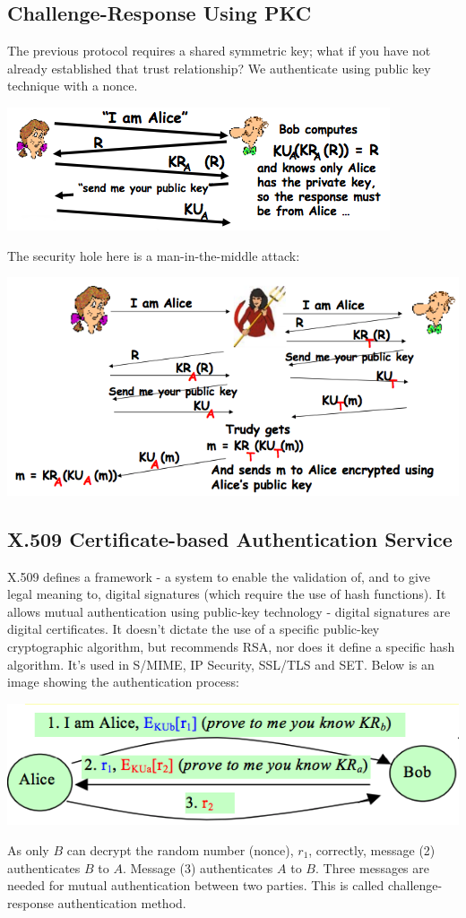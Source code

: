 \documentclass{article}
\begin{document}
\subsection{Challenge-Response Using PKC}
The previous protocol requires a shared symmetric key; what if you have not already established that trust relationship? We authenticate using public key technique with a nonce.
\begin{center}
  \includegraphics[scale=0.7]{crpkc.png}
\end{center}
The security hole here is a man-in-the-middle attack:
\begin{center}
  \includegraphics[scale=0.5]{crpkc-mitm.png}
\end{center}

\subsection{X.509 Certificate-based Authentication Service}
X.509 defines a framework - a system to enable the validation of, and to give legal meaning to, digital signatures (which require the use of hash functions). It allows mutual authentication using public-key technology - digital signatures are digital certificates. It doesn't dictate the use of a specific public-key cryptographic algorithm, but recommends RSA, nor does it define a specific hash algorithm. It's used in S/MIME, IP Security, SSL/TLS and SET. Below is an image showing the authentication process:
\begin{center}
  \includegraphics[scale=0.5]{x509-auth.png}
\end{center}
As only $B$ can decrypt the random number (nonce), $r_{1}$, correctly, message (2) authenticates $B$ to $A$. Message (3) authenticates $A$ to $B$. Three messages are needed for mutual authentication between two parties. This is called challenge-response authentication method.
\end{document}
